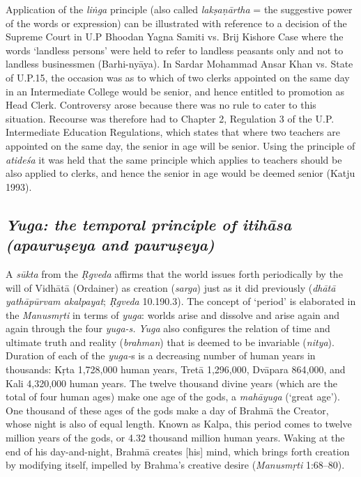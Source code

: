 Application of the \textit{liṅga} principle (also called \textit{lakṣaṇārtha} = the suggestive power of the words or expression) can be illustrated with reference to a decision of the Supreme Court in U.P Bhoodan Yagna Samiti vs. Brij Kishore Case where the words ‘landless persons’ were held to refer to landless peasants only and not to landless businessmen (Barhi-nyāya). In Sardar Mohammad Ansar Khan vs. State of U.P.15, the occasion was as to which of two clerks appointed on the same day in an Intermediate College would be senior, and hence entitled to promotion as Head Clerk. Controversy arose because there was no rule to cater to this situation. Recourse was therefore had to Chapter 2, Regulation 3 of the U.P. Intermediate Education Regulations, which states that where two teachers are appointed on the same day, the senior in age will be senior. Using the principle of \textit{atideśa} it was held that the same principle which applies to teachers should be also applied to clerks, and hence the senior in age would be deemed senior (Katju 1993).


\subsection*{\textit{Yuga: the temporal principle of itihāsa (apauruṣeya and pauruṣeya)}}

A \textit{sūkta} from the \textit{Ṛgveda} affirms that the world issues forth periodically by the will of Vidhātā (Ordainer) as creation (\textit{sarga}) just as it did previously (\textit{dhātā yathāpūrvam akalpayat}; \textit{Ṛgveda} 10.190.3). The concept of ‘period’ is elaborated in the \textit{Manusmṛti}  in terms of \textit{yuga}: worlds arise and dissolve and arise again and again through the four \textit{yuga-s.} \textit{Yuga} also configures the relation of time and ultimate truth and reality (\textit{brahman}) that is deemed to be invariable (\textit{nitya}). Duration of each of the \textit{yuga-}s is a decreasing number of human years in thousands: Kṛta 1,728,000 human years, Tretā 1,296,000, Dvāpara 864,000, and Kali 4,320,000 human years. The twelve thousand divine years (which are the total of four human ages) make one age of the gods, a \textit{mahāyuga} (‘great age’). One thousand of these ages of the gods make a day of Brahmā the Creator, whose night is also of equal length. Known as Kalpa, this period comes to twelve million years of the gods, or 4.32 thousand million human years. Waking at the end of his day-and-night, Brahmā creates [his] mind, which brings forth creation by modifying itself, impelled by Brahma’s creative desire (\textit{Manusmṛti}  1:68–80).

